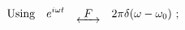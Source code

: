 \documentclass[preview]{standalone}
\begin{document}
\begin{align*}
\textrm{Using}& \quad e^{i\omega t} \quad \underleftrightarrow{ \ \ F \ \ } \quad 2\pi \delta(\omega - \omega_{0}) \ ; \\
\end{align*}
\end{document}
